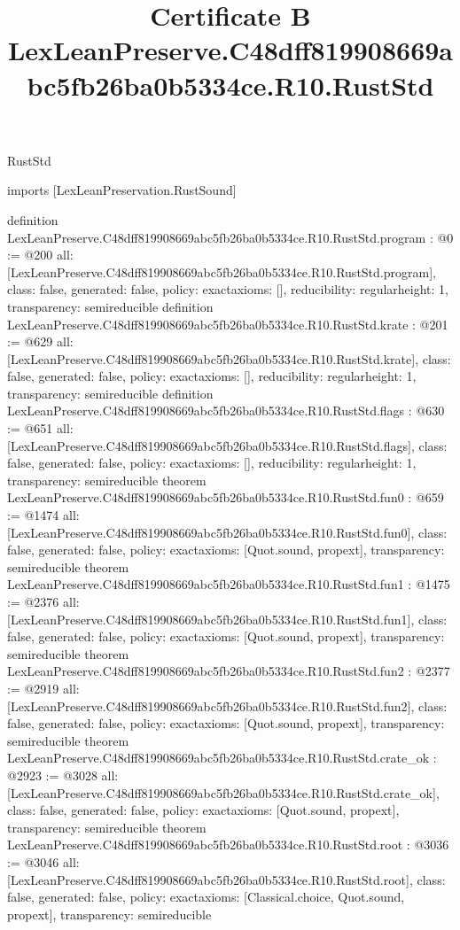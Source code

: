 \begin{lexlean}{RustStd}
\title{Certificate B LexLeanPreserve.C48dff819908669abc5fb26ba0b5334ce.R10.RustStd}
\begin{coremodule}
imports [LexLeanPreservation.RustSound]

definition LexLeanPreserve.C48dff819908669abc5fb26ba0b5334ce.R10.RustStd.program : @0 := @200 {
  all: [LexLeanPreserve.C48dff819908669abc5fb26ba0b5334ce.R10.RustStd.program],
  class: false,
  generated: false,
  policy: exact{axioms: []},
  reducibility: regular{height: 1},
  transparency: semireducible
}
definition LexLeanPreserve.C48dff819908669abc5fb26ba0b5334ce.R10.RustStd.krate : @201 := @629 {
  all: [LexLeanPreserve.C48dff819908669abc5fb26ba0b5334ce.R10.RustStd.krate],
  class: false,
  generated: false,
  policy: exact{axioms: []},
  reducibility: regular{height: 1},
  transparency: semireducible
}
definition LexLeanPreserve.C48dff819908669abc5fb26ba0b5334ce.R10.RustStd.flags : @630 := @651 {
  all: [LexLeanPreserve.C48dff819908669abc5fb26ba0b5334ce.R10.RustStd.flags],
  class: false,
  generated: false,
  policy: exact{axioms: []},
  reducibility: regular{height: 1},
  transparency: semireducible
}
theorem LexLeanPreserve.C48dff819908669abc5fb26ba0b5334ce.R10.RustStd.fun0 : @659 := @1474 {
  all: [LexLeanPreserve.C48dff819908669abc5fb26ba0b5334ce.R10.RustStd.fun0],
  class: false,
  generated: false,
  policy: exact{axioms: [Quot.sound, propext]},
  transparency: semireducible
}
theorem LexLeanPreserve.C48dff819908669abc5fb26ba0b5334ce.R10.RustStd.fun1 : @1475 := @2376 {
  all: [LexLeanPreserve.C48dff819908669abc5fb26ba0b5334ce.R10.RustStd.fun1],
  class: false,
  generated: false,
  policy: exact{axioms: [Quot.sound, propext]},
  transparency: semireducible
}
theorem LexLeanPreserve.C48dff819908669abc5fb26ba0b5334ce.R10.RustStd.fun2 : @2377 := @2919 {
  all: [LexLeanPreserve.C48dff819908669abc5fb26ba0b5334ce.R10.RustStd.fun2],
  class: false,
  generated: false,
  policy: exact{axioms: [Quot.sound, propext]},
  transparency: semireducible
}
theorem LexLeanPreserve.C48dff819908669abc5fb26ba0b5334ce.R10.RustStd.crate_ok : @2923 := @3028 {
  all: [LexLeanPreserve.C48dff819908669abc5fb26ba0b5334ce.R10.RustStd.crate_ok],
  class: false,
  generated: false,
  policy: exact{axioms: [Quot.sound, propext]},
  transparency: semireducible
}
theorem LexLeanPreserve.C48dff819908669abc5fb26ba0b5334ce.R10.RustStd.root : @3036 := @3046 {
  all: [LexLeanPreserve.C48dff819908669abc5fb26ba0b5334ce.R10.RustStd.root],
  class: false,
  generated: false,
  policy: exact{axioms: [Classical.choice, Quot.sound, propext]},
  transparency: semireducible
}


\end{coremodule}
\end{lexlean}
